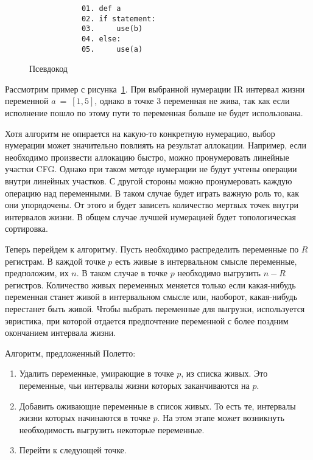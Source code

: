 \begin{example}
    \begin{figure}[h]
        \centering
        \lstset{basicstyle=\ttfamily\small, frame=single}
        \begin{lstlisting}
            01. def a
            02. if statement:
            03.     use(b)
            04. else:
            05.     use(a)
        \end{lstlisting}
        \caption{Псевдокод}
        \label{fig:example_live_intervals}
    \end{figure}

    Рассмотрим пример с рисунка~\ref{fig:example_live_intervals}. При выбранной нумерации IR интервал жизни переменной
    $a~=~[1,5]$, однако в точке $3$ переменная не жива, так как если исполнение пошло по этому пути
    то переменная больше не будет использована.
    
\end{example}

Хотя алгоритм не опирается на какую-то конкретную нумерацию,
выбор нумерации может значительно повлиять на результат аллокации.
Например, если необходимо произвести аллокацию быстро,
можно пронумеровать линейные участки CFG.
Однако при таком методе нумерации не будут учтены операции внутри линейных участков.
С другой стороны можно пронумеровать каждую операцию над переменными.
В таком случае будет играть важную роль то,
как они упорядочены.
От этого и будет зависеть количество мертвых точек внутри интервалов жизни.
В общем случае лучшей нумерацией будет топологическая сортировка.

Теперь перейдем к алгоритму. Пусть необходимо распределить переменные по $R$ регистрам. В каждой точке
$p$ есть живые в интервальном смысле переменные, предположим, их $n$. В таком случае в точке $p$
необходимо выгрузить $n - R$ регистров. Количество живых переменных меняется только если какая-нибудь
переменная станет живой в интервальном смысле или, наоборот, какая-нибудь перестанет быть живой.
Чтобы выбрать переменные для выгрузки, используется эвристика,
при которой отдается предпочтение переменной с более поздним окончанием интервала жизни.

Алгоритм, предложенный Полетто:

\begin{enumerate}
    \item Удалить переменные, умирающие в точке $p$, из списка живых.
    Это переменные, чьи интервалы жизни которых заканчиваются на $p$. \label{poleto_alg:delete_death}

    \item Добавить оживающие переменные в список живых.
    То есть те, интервалы жизни которых начинаются в точке $p$.
    На этом этапе может возникнуть необходимость выгрузить некоторые переменные. \label{poleto_alg:add_alive}

    \item Перейти к следующей точке.
\end{enumerate}

